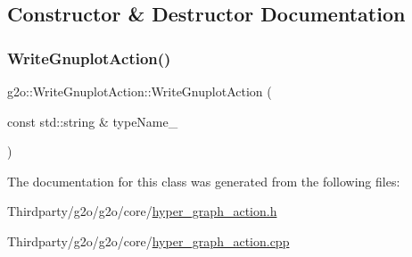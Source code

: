 \subsection{Constructor \& Destructor Documentation}
\mbox{\label{classg2o_1_1_write_gnuplot_action_abfae045b16ae760f6d0c7feefe4b751f}} 
\subsubsection{\texorpdfstring{Write\+Gnuplot\+Action()}{WriteGnuplotAction()}}
{\footnotesize\ttfamily g2o\+::\+Write\+Gnuplot\+Action\+::\+Write\+Gnuplot\+Action (\begin{DoxyParamCaption}\item[{const std\+::string \&}]{type\+Name\+\_\+ }\end{DoxyParamCaption})}



The documentation for this class was generated from the following files\+:\begin{DoxyCompactItemize}
\item 
Thirdparty/g2o/g2o/core/\mbox{\hyperlink{hyper__graph__action_8h}{hyper\+\_\+graph\+\_\+action.\+h}}\item 
Thirdparty/g2o/g2o/core/\mbox{\hyperlink{hyper__graph__action_8cpp}{hyper\+\_\+graph\+\_\+action.\+cpp}}\end{DoxyCompactItemize}
